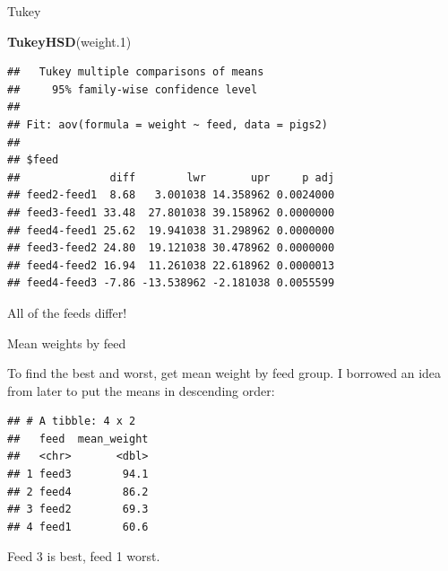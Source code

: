 \documentclass[ignorenonframetext,]{beamer}
\newenvironment{Shaded}{\begin{snugshade}}{\end{snugshade}}
\newcommand{\DataTypeTok}[1]{\textcolor[rgb]{0.13,0.29,0.53}{#1}}
\newcommand{\FloatTok}[1]{\textcolor[rgb]{0.00,0.00,0.81}{#1}}
\newcommand{\KeywordTok}[1]{\textcolor[rgb]{0.13,0.29,0.53}{\textbf{#1}}}
\newcommand{\NormalTok}[1]{#1}
\newcommand{\OperatorTok}[1]{\textcolor[rgb]{0.81,0.36,0.00}{\textbf{#1}}}
\newcommand{\StringTok}[1]{\textcolor[rgb]{0.31,0.60,0.02}{#1}}
\begin{document}
\begin{frame}[fragile]{Tukey}
\protect\hypertarget{tukey}{}

\begin{Shaded}
\begin{Highlighting}[]
\KeywordTok{TukeyHSD}\NormalTok{(weight}\FloatTok{.1}\NormalTok{)}
\end{Highlighting}
\end{Shaded}

\begin{verbatim}
##   Tukey multiple comparisons of means
##     95% family-wise confidence level
## 
## Fit: aov(formula = weight ~ feed, data = pigs2)
## 
## $feed
##              diff        lwr       upr     p adj
## feed2-feed1  8.68   3.001038 14.358962 0.0024000
## feed3-feed1 33.48  27.801038 39.158962 0.0000000
## feed4-feed1 25.62  19.941038 31.298962 0.0000000
## feed3-feed2 24.80  19.121038 30.478962 0.0000000
## feed4-feed2 16.94  11.261038 22.618962 0.0000013
## feed4-feed3 -7.86 -13.538962 -2.181038 0.0055599
\end{verbatim}

All of the feeds differ!

\end{frame}

\begin{frame}[fragile]{Mean weights by feed}
\protect\hypertarget{mean-weights-by-feed}{}

To find the best and worst, get mean weight by feed group. I borrowed an
idea from later to put the means in descending order:

\begin{Shaded}
\end{Shaded}

\begin{verbatim}
## # A tibble: 4 x 2
##   feed  mean_weight
##   <chr>       <dbl>
## 1 feed3        94.1
## 2 feed4        86.2
## 3 feed2        69.3
## 4 feed1        60.6
\end{verbatim}

Feed 3 is best, feed 1 worst.

\end{frame}
\end{document}
